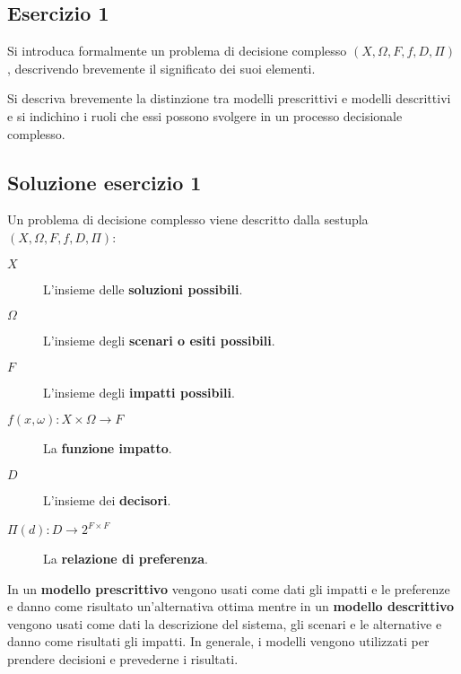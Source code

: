 \documentclass[\main/main.tex]{subfiles}
\begin{document}
\subsection{Esercizio 1}
Si introduca formalmente un problema di decisione complesso $(X, \Omega, F, f, D, \Pi)$, descrivendo brevemente il significato dei suoi elementi.

Si descriva brevemente la distinzione tra modelli prescrittivi e modelli descrittivi e si indichino i ruoli che essi possono svolgere in un processo decisionale complesso.

\subsection{Soluzione esercizio 1}

Un problema di decisione complesso viene descritto dalla sestupla $(X, \Omega, F, f, D, \Pi)$:

\begin{description}
  \item [$X$] L'insieme delle \textbf{soluzioni possibili}.
  \item [$\Omega$] L'insieme degli \textbf{scenari o esiti possibili}.
  \item [$F$] L'insieme degli \textbf{impatti possibili}.
  \item [$f(x, \omega): X \times \Omega  \rightarrow F$] La \textbf{funzione impatto}.
  \item [$D$] L'insieme dei \textbf{decisori}.
  \item [$\Pi(d): D \rightarrow 2^{F\times F}$] La \textbf{relazione di preferenza}.
\end{description}

In un \textbf{modello prescrittivo} vengono usati come dati gli impatti e le preferenze e danno come risultato un'alternativa ottima mentre in un \textbf{modello descrittivo} vengono usati come dati la descrizione del sistema, gli scenari e le alternative e danno come risultati gli impatti. In generale, i modelli vengono utilizzati per prendere decisioni e prevederne i risultati.
\end{document}
